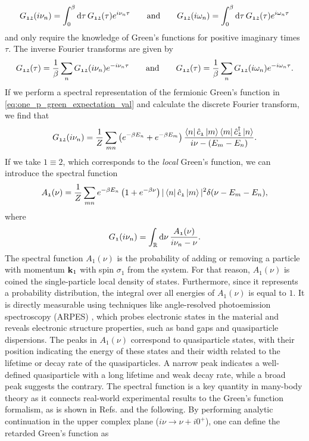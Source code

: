 \documentclass[../../main.tex]{subfiles}
\begin{document}
\begin{align}
	G_{\mathfrak{12}}(i\nu_n)=\int_{0}^{\beta}\text{d}\tau\,G_{\mathfrak{12}}(\tau) e^{i\nu_n\tau} \qquad\text{and}\qquad G_{\mathfrak{12}}(i\omega_n)=\int_{0}^{\beta}\text{d}\tau\,G_{\mathfrak{12}}(\tau) e^{i\omega_n\tau}
\end{align}
and only require the knowledge of Green's functions for positive imaginary times $\tau$. The inverse Fourier transforms are given by
\begin{align}
	G_{\mathfrak{12}}(\tau)=\frac1\beta \sum_n G_{\mathfrak{12}}(i\nu_n) e^{-i\nu_n\tau} \qquad\text{and}\qquad G_{\mathfrak{12}}(\tau)=\frac1\beta \sum_n G_{\mathfrak{12}}(i\omega_n) e^{-i\omega_n\tau}.
\end{align}
If we perform a spectral representation of the fermionic Green's function in \eqref{eq:one_p_green_expectation_val} and calculate the discrete Fourier transform, we find that
\begin{align}
	G_{\mathfrak{12}}(i\nu_n)=\frac1Z\sum_{mn}\left (e^{-\beta E_n}+e^{-\beta E_m}\right )\frac{\bra{n} \hat c_{\mathfrak{1}} \ket{m}\bra{m} \hat c^{\dagger}_{\mathfrak{2}} \ket{n}}{i\nu-(E_m-E_n)}.
\end{align}
If we take $\mathfrak{1}\equiv \mathfrak{2}$, which corresponds to the \textit{local} Green's function, we can introduce the spectral function
\begin{align}
	A_{\mathfrak{1}}(\nu)=\frac1Z\sum_{mn} e^{-\beta E_n}\left (1+e^{-\beta\nu}\right ) |\bra{n} \hat c_{\mathfrak{1}} \ket{m}|^2 \delta(\nu-E_m-E_n),
\end{align}
where
\begin{align}
	G_{\mathfrak{1}}(i\nu_n)=\int_{\mathbb{R}}^{}\text{d}\nu\,\frac{A_{\mathfrak{1}}(\nu)}{i\nu_n-\nu}.
\end{align}
The spectral function $A_{\mathfrak{1}}(\nu)$ is the probability of adding or removing a particle with momentum $\textbf{k}_1$ with spin $\sigma_1$ from the system. For that reason, $A_{\mathfrak{1}}(\nu)$ is coined the single-particle local density of states. Furthermore, since it represents a probability distribution, the integral over all energies of $A_{\mathfrak{1}}(\nu)$ is equal to $1$. It is directly measurable using techniques like angle-resolved photoemission spectroscopy (ARPES) \cite{Hwang2008, Jang2017}, which probes electronic states in the material and reveals electronic structure properties, such as band gaps and quasiparticle dispersions. The peaks in $A_{\mathfrak{1}}(\nu)$ correspond to quasiparticle states, with their position indicating the energy of these states and their width related to the lifetime or decay rate of the quasiparticles. A narrow peak indicates a well-defined quasiparticle with a long lifetime and weak decay rate, while a broad peak suggests the contrary. The spectral function is a key quantity in many-body theory as it connects real-world experimental results to the Green's function formalism, as is shown in Refs. \cite{Hwang2008, Jang2017} and the following. By performing analytic continuation in the upper complex plane ($i\nu\to\nu+i0^{+}$), one can define the retarded Green's function as
\end{document}
